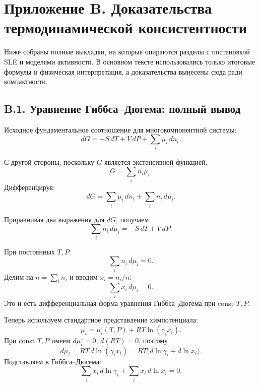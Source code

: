 \documentclass[11pt]{article}
\begin{document}
\section*{Приложение B. Доказательства термодинамической консистентности}

Ниже собраны полные выкладки, на которые опираются разделы с постановкой SLE и моделями активности. В основном тексте использовались только итоговые формулы и физическая интерпретация, а доказательства вынесены сюда ради компактности.

\subsection*{B.1. Уравнение Гиббса--Дюгема: полный вывод}

Исходное фундаментальное соотношение для многокомпонентной системы:
\begin{equation*}
dG = -S\,dT + V\,dP + \sum_i \mu_i\,dn_i.
\end{equation*}

С другой стороны, поскольку $G$ является экстенсивной функцией,
\begin{equation*}
G = \sum_i n_i\mu_i.
\end{equation*}
Дифференцируя:
\begin{equation*}
dG = \sum_i \mu_i\,dn_i + \sum_i n_i\,d\mu_i.
\end{equation*}

Приравнивая два выражения для $dG$, получаем
\begin{equation*}
\sum_i n_i\,d\mu_i = -S\,dT + V\,dP.
\end{equation*}

При постоянных $T,P$:
\begin{equation*}
\sum_i n_i\,d\mu_i = 0.
\end{equation*}
Делим на $n=\sum_i n_i$ и вводим $x_i=n_i/n$:
\begin{equation*}
\sum_i x_i\,d\mu_i = 0.
\end{equation*}
Это и есть дифференциальная форма уравнения Гиббса--Дюгема при const $T,P$.

Теперь используем стандартное представление химпотенциала:
\begin{equation*}
\mu_i = \mu_i^{\circ}(T,P) + RT\ln(\gamma_i x_i).
\end{equation*}
При const $T,P$ имеем $d\mu_i^{\circ}=0$, $d(RT)=0$, поэтому
\begin{equation*}
d\mu_i = RT\,d\ln(\gamma_i x_i)=RT\bigl(d\ln\gamma_i + d\ln x_i\bigr).
\end{equation*}
Подставляем в Гиббса--Дюгема:
\begin{equation*}
\sum_i x_i\,d\ln\gamma_i + \sum_i x_i\,d\ln x_i = 0.
\end{equation*}
\end{document}
